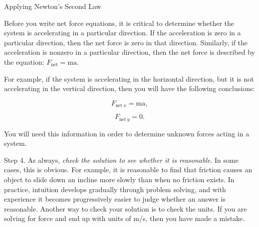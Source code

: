 \documentclass[
]{book}
\newenvironment{note}{}{}
\begin{document}
\hypertarget{fs-id1316241}{}
\begin{note}

Applying Newton's Second Law

Before you write net force equations, it is critical to determine
whether the system is accelerating in a particular direction. If the
acceleration is zero in a particular direction, then the net force is
zero in that direction. Similarly, if the acceleration is nonzero in a
particular direction, then the net force is described by the equation:
\({F_{\text{net}} = \text{ma}}{}\).

For example, if the system is accelerating in the horizontal direction,
but it is not accelerating in the vertical direction, then you will have
the following conclusions:

\leavevmode\hypertarget{eip-id1449134}{}%
\[{F_{\text{net}\ x} = \text{ma}},\]

\leavevmode\hypertarget{eip-id1478667}{}%
\[{F_{\text{net}\ y} = 0}.\]

You will need this information in order to determine unknown forces
acting in a system.

\end{note}

Step 4. As always, \emph{check the solution to see whether it is reasonable}.
In some cases, this is obvious. For example, it is reasonable to find
that friction causes an object to slide down an incline more slowly than
when no friction exists. In practice, intuition develops gradually
through problem solving, and with experience it becomes progressively
easier to judge whether an answer is reasonable. Another way to check
your solution is to check the units. If you are solving for force and
end up with units of m/s, then you have made a mistake.
\end{document}
